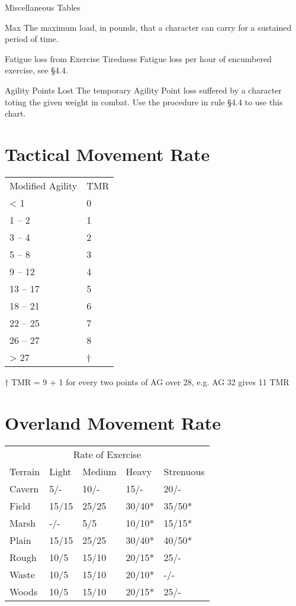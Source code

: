 \begin{Tables}{Miscellaneous Tables}
\begin{Description}
\item[Max] The maximum load, in pounds, that a character can carry for
  a sustained period of time.

\item[Fatigue loss from Exercise] Tiredness Fatigue loss per hour of
  encumbered exercise, see §4.4.

\item[Agility Points Lost] The temporary Agility Point loss suffered by a
character toting the given weight in combat.  Use the procedure in
rule §4.4 to use this chart.
\end{Description}

\begin{multicols}{2}

\section{Tactical Movement Rate}

\begin{tabularx}{\columnwidth}{Xl}
Modified Agility  & TMR \\
< 1	& 0 \\
1 – 2	& 1 \\
3 – 4	& 2 \\
5 – 8	& 3 \\
9 – 12	& 4 \\
13 – 17	& 5 \\
18 – 21	& 6 \\
22 – 25	& 7 \\
26 – 27	& 8 \\
> 27	& † \\
\end{tabularx}

†  TMR  =  9  +  1  for  every  two  points  of  AG  over 
28, e.g. AG 32 gives 11 TMR 


\section{Overland Movement Rate} 

\begin{tabularx}{\columnwidth}{lllll}
\multicolumn{5}{c}{Rate of Exercise} \\
Terrain		& Light		& Medium	& Heavy		& Strenuous \\
Cavern		& 5/-		& 10/-		& 15/-		& 20/-	\\
Field		& 15/15		& 25/25		& 30/40*	& 35/50* \\
Marsh		& -/-		& 5/5		& 10/10*	& 15/15* \\
Plain		& 15/15		& 25/25		& 30/40*	& 40/50* \\
Rough		& 10/5		& 15/10		& 20/15*	& 25/- \\
Waste		& 10/5		& 15/10		& 20/10*	& -/- \\
Woods		& 10/5		& 15/10		& 20/15*	& 25/- \\
\end{tabularx}


\end{multicols}
\end{Tables}
